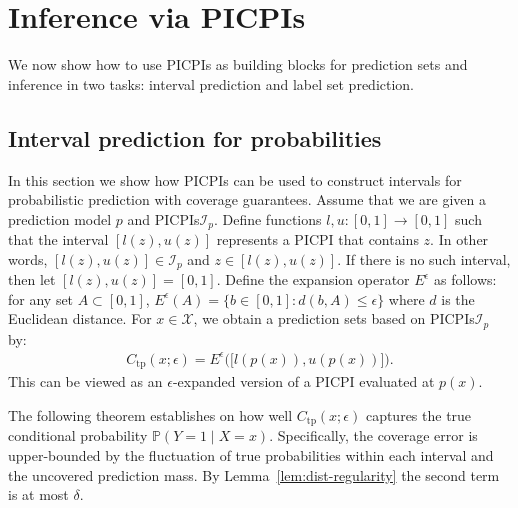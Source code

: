 \documentclass[11pt]{article}
\theoremstyle{statplain}
\newtheorem{theorem}{Theorem}[section]
\theoremstyle{statdefinition}
\DeclareMathOperator{\Var}{Var}
\newcommand{\tp}{\mathrm{tp}}
\newcommand{\E}{\mathbb{E}}
\newcommand{\PP}{\mathbb{P}}
\newcommand{\0}{\mathbf{0}}
\newcommand{\I}{\mathcal{I}}
\newcommand{\J}{\mathcal{J}}
\newcommand{\X}{\mathcal{X}}
\newcommand{\interval}{I} %
\newcommand{\intervalset}{\I} %
\newcommand{\numInterval}{J} %
\newcommand{\iteratorInterval}{j}
\newcommand{\titleShort}{PICPI\xspace}
\newcommand{\titleShorts}{PICPIs\xspace}
\begin{document}
\section{Inference via \titleShorts}\label{sec:tasks}

We now show how to use \titleShorts as building blocks for prediction sets and inference in two tasks: interval prediction and label set prediction.


\subsection{Interval prediction for probabilities}\label{sec:task_1}

In this section we show how \titleShorts can be used to construct intervals for probabilistic prediction with coverage guarantees.
Assume that we are given a prediction model $p$ and \titleShorts $\intervalset_p$.
Define functions $l,u: [0,1] \to [0,1]$ such that the interval $[l(z),u(z)]$ represents a \titleShort that contains $z$. 
In other words, $[l(z),u(z)]\in\intervalset_p$ and $z \in [l(z) ,u(z)]$.
If there is no such interval, then let $[l(z),u(z)] = [0,1]$. 
Define the expansion operator $E^\epsilon$ as follows: for any set $A \subset [0,1]$, $E^\epsilon(A) = \{b \in [0,1]: d(b,A) \leq \epsilon\}$ where $d$ is the Euclidean distance. 
For $x\in\X$, we obtain a prediction sets based on \titleShorts $\intervalset_p$ by:
\begin{align}\label{eq:task-predicting_true_prob}
    C_{\tp}(x;\epsilon) = E^\epsilon\Big(\Big[l(p(x)),u(p(x))\Big]\Big).
\end{align}
This can be viewed as an $\epsilon$-expanded version of a \titleShort evaluated at $p(x)$.

The following theorem establishes on how well $C_{\tp}(x;\epsilon)$ captures the true conditional probability $\PP(Y=1\mid X=x) $. Specifically, the coverage error is upper-bounded by the fluctuation of true probabilities within each interval and the uncovered prediction mass. By Lemma~\ref{lem:dist-regularity} the second term is at most $\delta$.


\end{document}
